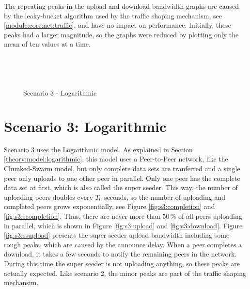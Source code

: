 The repeating peaks in the upload and download bandwidth graphs are caused by the leaky-bucket algorithm used by the traffic shaping mechanism, see \ref{module:core:net:traffic}, and have no impact on performance. Initially, these peaks 
had a larger magnitude, so the graphs were reduced by plotting only the mean of ten values at a time.

\vfill


\begin{figure}[!ht]
	\begin{center}	
		~ %

	 	~ %

		\caption{Scenario 3 - Logarithmic}
		\label{fig:s3}
	\end{center}
\end{figure}

\pagebreak
\section{Scenario 3: Logarithmic}
\label{evaluation:3}

Scenario 3 uses the Logarithmic model. As explained in Section \ref{theory:model:logarithmic}, this model uses a Peer-to-Peer network, like the Chunked-Swarm model, but only complete data sets are tranferred and a single peer only uploads to one other peer in parallel. Only one peer has the complete data set at first, which is also called the super seeder. This way, the number of uploading peers doubles every $T_0$ seconds, so the number of uploading and completed peers grows exponentially, see Figure \ref{fig:s3:completion} and \ref{fig:s3:scompletion}. Thus, there are never more than 50\,\% of all peers uploading in parallel, which is shown in Figure \ref{fig:s3:upload} and \ref{fig:s3:download}. Figure \ref{fig:s3:ssupload} presents the super seeder upload bandwidth including some rough peaks, which are caused by the announce delay. When a peer completes a download, it takes a few seconds to notify the remaining peers in the network. During this time the super seeder is not uploading anything, so these peaks are actually expected. Like scenario 2, the minor peaks are part of the traffic shaping mechansim.

